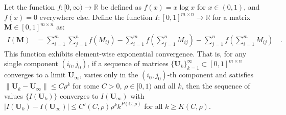 \documentclass[../../main.tex]{subfiles}
\begin{document}
\begin{theorem}
Let the function $f: [0, \infty) \to \mathbb{R}$ be defined as $f(x) = x \log x$ for $x \in (0, 1)$, and $f(x) = 0$ everywhere else. Define the function $I: [0, 1]^{m \times n} \to \mathbb{R}$ for a matrix $\bm{M} \in [0, 1]^{m \times n}$ as:
\begin{align*}
    I(\bm{M}) &= \sum_{i=1}^m \sum_{j=1}^n f(M_{ij}) - \sum_{i=1}^m f\left(\sum_{j=1}^n M_{ij}\right) - \sum_{j=1}^n f\left(\sum_{i=1}^m M_{ij}\right) \quad .
\end{align*}
This function exhibits element-wise exponential convergence. That is, for any single component $(i_0, j_0)$, if a sequence of matrices $\{\bm{U}_k\}_{k=1}^\infty \subset [0, 1]^{m \times n}$ converges to a limit $\bm{U}_\infty$, varies only in the $(i_0, j_0)$-th component and satisfies $\|\bm{U}_k - \bm{U}_\infty\| \leq C \rho^k$ for some $C > 0$, $\rho \in [0, 1)$ and all $k$, then the sequence of values $\{I(\bm{U}_k)\}$ converges to $I(\bm{U}_\infty)$ with $|I(\bm{U}_k) - I(\bm{U}_\infty)| \leq C'(C, \rho) \rho^k k^{P(C, \rho)}$ for all $k \geq K(C, \rho)$.
\end{theorem}
\end{document}
